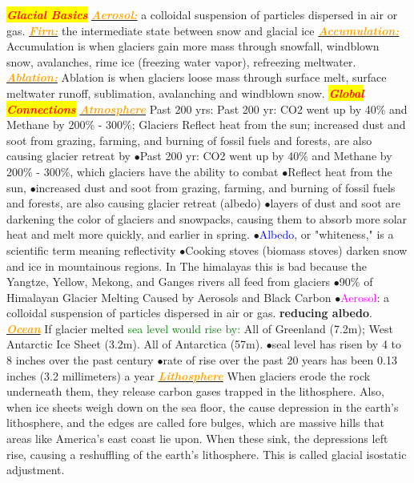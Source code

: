 \documentclass{article}
\author{SBHS Science Olympiad, Gold}
\newcommand{\ddd}{$\bullet$}
\newcommand{\red}[1]{\textcolor{red}{#1}}
\newcommand{\green}[1]{\textcolor{green}{#1}}
\newcommand{\blue}[1]{\textcolor{blue}{#1}}
\newcommand{\pink}[1]{\textcolor{magenta}{#1}}
\newcommand{\orange}[1]{\textcolor{orange}{#1}}
\newcommand{\mysection}[1]{\colorbox{yellow}{{\textbf{\textbf{\textit{\red{#1}}}}}}}
\newcommand{\mysub}[1]{\underline{\textbf{{\textit{\orange{#1}}}}}}
\newcommand{\mysubsub}[1]{{{\green{#1}}}}
\newcommand{\vocab}[1]{{\pink{#1}}}
\begin{document}
	 \tiny
	\begin{multicols*}{4}
	
		\mysection{Glacial Basics}
		\mysub{Aerosol:} a colloidal suspension of particles dispersed in air or gas.
		\mysub{Firn:} the intermediate state between snow and glacial ice
		\mysub{Accumulation:} Accumulation is when glaciers gain more mass through snowfall, windblown snow, avalanches, rime ice (freezing water vapor), refreezing meltwater.
		\mysub{Ablation:} Ablation is when glaciers loose mass through surface melt, surface meltwater runoff, sublimation, avalanching and windblown snow.
         \mysection{Global Connections}
		\mysub{Atmosphere}
		Past 200 yrs: Past 200 yr: CO2 went up by 40\% and Methane by 200\% - 300\%; Glaciers Reflect heat from the sun; increased dust and soot from grazing, farming, and burning of fossil fuels and forests, are also causing glacier retreat by
		 \ddd Past 200 yr: CO2 went up by 40\% and Methane by 200\% - 300\%, which glaciers have the ability to combat
       \ddd Reflect heat from the sun, 
        \ddd increased dust and soot from grazing, farming, and burning of fossil fuels and forests, are also causing glacier retreat (albedo)
        \ddd layers of dust and soot are darkening the color of glaciers and snowpacks, causing them to absorb more solar heat and melt more quickly, and earlier in spring.
        \ddd \blue{Albedo}, or "whiteness," is a scientific term meaning reflectivity
        \ddd Cooking stoves (biomass stoves) darken snow and ice in mountainous regions. In The himalayas this is bad because the Yangtze, Yellow, Mekong, and Ganges rivers all feed from glaciers
        \ddd 90\% of Himalayan Glacier Melting Caused by Aerosols and Black Carbon
        \ddd \vocab{Aerosol}: a colloidal suspension of particles dispersed in air or gas.
		\textbf{reducing albedo}.
		\mysub{Ocean} If glacier melted 
		\mysubsub{sea level would rise by: } All of Greenland (7.2m); West Antarctic Ice Sheet (3.2m). All of Antarctica (57m). 
         \ddd seal level has risen by 4 to 8 inches over the past century
         \ddd rate of rise over the past 20 years has been 0.13 inches (3.2 millimeters) a year
		\mysub{Lithosphere} When glaciers erode the rock underneath them, they release carbon gases trapped in the lithosphere. Also, when ice sheets weigh down on the sea floor, the cause depression in the earth's lithosphere, and the edges are called fore bulges, which are massive hills that areas like America's east coast lie upon. When these sink, the depressions left rise, causing a reshuffling of the earth's lithosphere. This is called glacial isostatic adjustment.

\end{multicols*}
\end{document}
